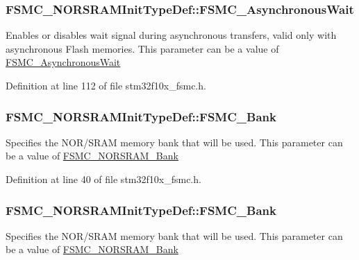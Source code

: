 \subsubsection[{\texorpdfstring{F\+S\+M\+C\+\_\+\+Asynchronous\+Wait}{FSMC_AsynchronousWait}}]{ F\+S\+M\+C\+\_\+\+N\+O\+R\+S\+R\+A\+M\+Init\+Type\+Def\+::\+F\+S\+M\+C\+\_\+\+Asynchronous\+Wait}\hypertarget{struct_f_s_m_c___n_o_r_s_r_a_m_init_type_def_ac350cc34377fe3d5f882a6801bab1ac9}{}\label{struct_f_s_m_c___n_o_r_s_r_a_m_init_type_def_ac350cc34377fe3d5f882a6801bab1ac9}
Enables or disables wait signal during asynchronous transfers, valid only with asynchronous Flash memories. This parameter can be a value of \hyperlink{group___f_s_m_c___asynchronous_wait}{F\+S\+M\+C\+\_\+\+Asynchronous\+Wait} 

Definition at line 112 of file stm32f10x\+\_\+fsmc.\+h.

\subsubsection[{\texorpdfstring{F\+S\+M\+C\+\_\+\+Bank}{FSMC_Bank}}]{ F\+S\+M\+C\+\_\+\+N\+O\+R\+S\+R\+A\+M\+Init\+Type\+Def\+::\+F\+S\+M\+C\+\_\+\+Bank}\hypertarget{struct_f_s_m_c___n_o_r_s_r_a_m_init_type_def_aba41d7be800c3c67d0ecfa76ae2a8da3}{}\label{struct_f_s_m_c___n_o_r_s_r_a_m_init_type_def_aba41d7be800c3c67d0ecfa76ae2a8da3}
Specifies the N\+O\+R/\+S\+R\+AM memory bank that will be used. This parameter can be a value of \hyperlink{group___f_s_m_c___n_o_r_s_r_a_m___bank}{F\+S\+M\+C\+\_\+\+N\+O\+R\+S\+R\+A\+M\+\_\+\+Bank} 

Definition at line 40 of file stm32f10x\+\_\+fsmc.\+h.

\subsubsection[{\texorpdfstring{F\+S\+M\+C\+\_\+\+Bank}{FSMC_Bank}}]{ F\+S\+M\+C\+\_\+\+N\+O\+R\+S\+R\+A\+M\+Init\+Type\+Def\+::\+F\+S\+M\+C\+\_\+\+Bank}\hypertarget{struct_f_s_m_c___n_o_r_s_r_a_m_init_type_def_a7fcd864461cf0d1cf83b62fa2b4d3f86}{}\label{struct_f_s_m_c___n_o_r_s_r_a_m_init_type_def_a7fcd864461cf0d1cf83b62fa2b4d3f86}
Specifies the N\+O\+R/\+S\+R\+AM memory bank that will be used. This parameter can be a value of \hyperlink{group___f_s_m_c___n_o_r_s_r_a_m___bank}{F\+S\+M\+C\+\_\+\+N\+O\+R\+S\+R\+A\+M\+\_\+\+Bank} 

